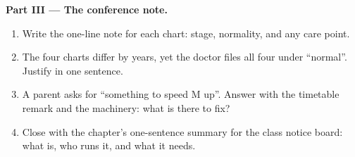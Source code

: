 \begin{problem}
\medskip\noindent\textbf{Part III --- The conference
note.}
\begin{enumerate}[resume]
  \item Write the one-line note for each chart: stage,
        normality, and any care point.
  \item The four charts differ by years, yet the doctor
        files all four under ``normal''. Justify in one
        sentence.
  \item A parent asks for ``something to speed M up''.
        Answer with the timetable remark and the
        machinery: what is there to fix?
  \item Close with the chapter's one-sentence summary
        for the class notice board: what  is,
        who runs it, and what it needs.
\end{enumerate}
\end{problem}
